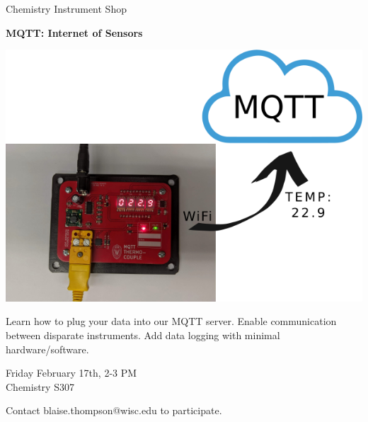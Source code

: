 \documentclass{article}
\begin{document}
\center

\Huge

Chemistry Instrument Shop

\textbf{
MQTT: Internet of Sensors
}

\includegraphics[width=\linewidth]{coverart.png}

{
\huge
Learn how to plug your data into our MQTT server.
Enable communication between disparate instruments.
Add data logging with minimal hardware/software.
}

\vfill

{
\huge
Friday February 17th, 2-3 PM \\
Chemistry S307
}

\vfill

{
\huge
Contact blaise.thompson@wisc.edu to participate.
}
\end{document}
